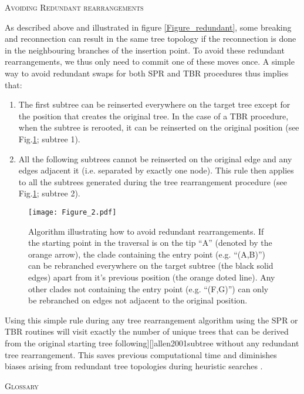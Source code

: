 \documentclass[12pt,letterpaper]{article}
\renewcommand{\section}[1]{%
\bigskip
\begin{center}
\begin{Large}
\normalfont\scshape #1
\medskip
\end{Large}
\end{center}}
\begin{document}
\section{Avoiding Redundant rearrangements}
As described above and illustrated in figure \ref{Figure_redundant}, some breaking and reconnection can result in the same tree topology if the reconnection is done in the neighbouring branches of the insertion point.
To avoid these redundant rearrangements, we thus only need to commit one of these moves once.
A simple way to avoid redundant swaps for both SPR and TBR procedures thus implies that:
\begin{enumerate}
    \item The first subtree can be reinserted everywhere on the target tree except for the position that creates the original tree. In the case of a TBR procedure, when the subtree is rerooted, it can be reinserted on the original position (see Fig.\ref{Figure_Neighbor}; subtree 1).
    \item All the following subtrees cannot be reinserted on the original edge and any edges adjacent it (i.e. separated by exactly one node). This rule then applies to all the subtrees generated during the tree rearrangement procedure (see Fig.\ref{Figure_Neighbor}; subtree 2).
\end{enumerate}

\begin{figure}[!htbp]
\centering
   \texttt{[image: Figure\_2.pdf]}
\caption{Algorithm illustrating how to avoid redundant rearrangements. If the starting point in the traversal is on the tip ``A'' (denoted by the orange arrow), the clade containing the entry point (e.g. ``(A,B)'') can be rebranched everywhere on the target subtree (the black solid edges) apart from it's previous position (the orange doted line). Any other clades not containing the entry point (e.g. ``(F,G)'') can only be rebranched on edges not adjacent to the original position.}
\label{Figure_Neighbor}
\end{figure}

Using this simple rule during any tree rearrangement algorithm using the SPR or TBR routines will visit exactly the number of unique trees that can be derived from the original starting tree following][]{allen2001subtree} without any redundant tree rearrangement.
This saves previous computational time and diminishes biases arising from redundant tree topologies during heuristic searches \citep{goloboff2014bias}.

\section{Glossary}
\label{Glossary}
\end{document}

